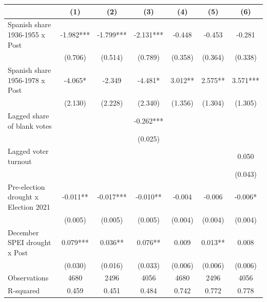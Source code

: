\begin{table}
\centering
\begin{tabular}[t]{lcccccc}
\toprule
  & (1) & (2) & (3) & (4) & (5) & (6)\\
\midrule
Spanish share 1936-1955 x Post & -1.982*** & -1.799*** & -2.131*** & -0.448 & -0.453 & -0.281\\
 & (0.706) & (0.514) & (0.789) & (0.358) & (0.364) & (0.338)\\
Spanish share 1956-1978 x Post & -4.065* & -2.349 & -4.481* & 3.012** & 2.575** & 3.571***\\
 & (2.130) & (2.228) & (2.340) & (1.356) & (1.304) & (1.305)\\
Lagged share of blank votes &  &  & -0.262*** &  &  & \\
 &  &  & (0.025) &  &  & \\
Lagged voter turnout &  &  &  &  &  & 0.050\\
 &  &  &  &  &  & (0.043)\\
Pre-election drought x Election 2021 & -0.011** & -0.017*** & -0.010** & -0.004 & -0.006 & -0.006*\\
 & (0.005) & (0.005) & (0.005) & (0.004) & (0.004) & (0.004)\\
December SPEI drought x Post & 0.079*** & 0.036** & 0.076** & 0.009 & 0.013** & 0.008\\
 & (0.030) & (0.016) & (0.033) & (0.006) & (0.006) & (0.006)\\
\midrule
Observations & 4680 & 2496 & 4056 & 4680 & 2496 & 4056\\
R-squared & 0.459 & 0.451 & 0.484 & 0.742 & 0.772 & 0.778\\
\bottomrule
\end{tabular}
\end{table}
